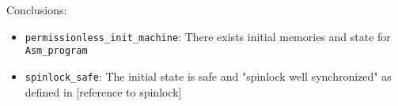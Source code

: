 Conclusions:

\begin{itemize}
\item \lstinline{permissionless_init_machine}: There exists initial memories and state for \lstinline{Asm_program}

\item \lstinline{spinlock_safe}: The initial state is safe and "spinlock well synchronized"
as defined in [reference to spinlock]%

\end{itemize}